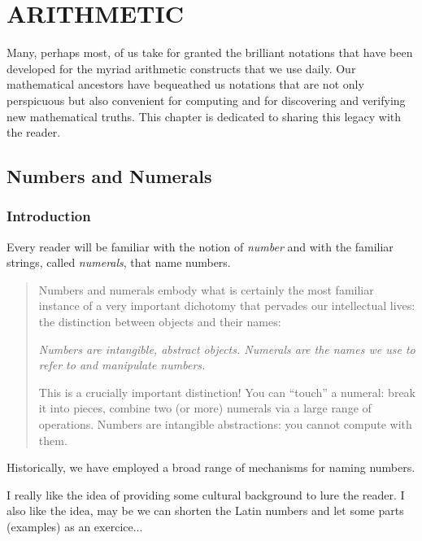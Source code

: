 
\chapter{ARITHMETIC}
\label{ch:arithmetic}

Many, perhaps most, of us take for granted the brilliant notations
that have been developed for the myriad arithmetic constructs that we
use daily.  Our mathematical ancestors have bequeathed us notations
that are not only perspicuous but also convenient for computing and
for discovering and verifying new mathematical truths.  This chapter
is dedicated to sharing this legacy with the reader.

\section{Numbers and Numerals}
\label{sec:numbers-numerals}

\subsection{Introduction}

Every reader will be familiar with the notion of {\it number} and with
the familiar strings, called {\it numerals}, that name numbers.
\begin{quote}
Numbers and numerals embody what is certainly the most familiar
instance of a very important dichotomy that pervades our intellectual
lives: the distinction between objects and their names:

{\em Numbers are intangible, abstract objects.  Numerals are the names
  we use to refer to and manipulate numbers.}

This is a crucially important distinction!  You can ``touch'' a
numeral: break it into pieces, combine two (or more) numerals via a
large range of operations.  Numbers are intangible abstractions: you
cannot compute with them.
\end{quote}
Historically, we have employed a broad range of mechanisms for naming
numbers.

{\Arny I really like the idea of providing some cultural background to
  lure the reader.  }
{\Denis I also like the idea, may be we can shorten the Latin numbers and let some parts (examples) as an exercice...}

